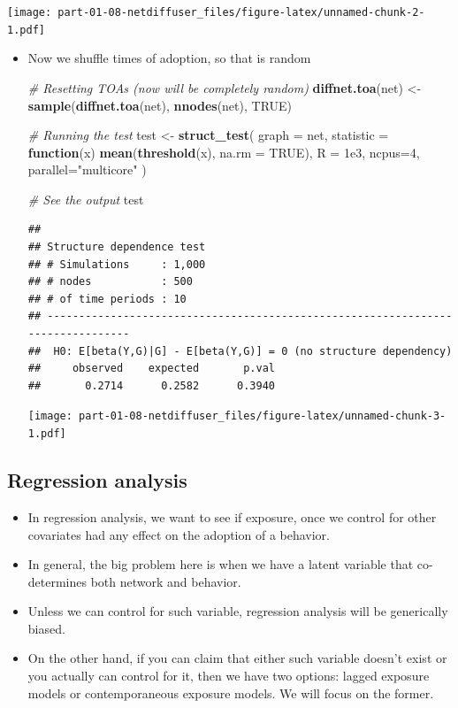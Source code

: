 \documentclass[]{book}
\newenvironment{Shaded}{\begin{snugshade}}{\end{snugshade}}
\newcommand{\CommentTok}[1]{\textcolor[rgb]{0.56,0.35,0.01}{\textit{#1}}}
\newcommand{\ControlFlowTok}[1]{\textcolor[rgb]{0.13,0.29,0.53}{\textbf{#1}}}
\newcommand{\DataTypeTok}[1]{\textcolor[rgb]{0.13,0.29,0.53}{#1}}
\newcommand{\DecValTok}[1]{\textcolor[rgb]{0.00,0.00,0.81}{#1}}
\newcommand{\FloatTok}[1]{\textcolor[rgb]{0.00,0.00,0.81}{#1}}
\newcommand{\KeywordTok}[1]{\textcolor[rgb]{0.13,0.29,0.53}{\textbf{#1}}}
\newcommand{\NormalTok}[1]{#1}
\newcommand{\OtherTok}[1]{\textcolor[rgb]{0.56,0.35,0.01}{#1}}
\newcommand{\StringTok}[1]{\textcolor[rgb]{0.31,0.60,0.02}{#1}}
\begin{document}
\texttt{[image: part-01-08-netdiffuser\_files/figure-latex/unnamed-chunk-2-1.pdf]}

\begin{itemize}
\item
  Now we shuffle times of adoption, so that is random

\begin{Shaded}
\begin{Highlighting}[]
\CommentTok{# Resetting TOAs (now will be completely random)}
\KeywordTok{diffnet.toa}\NormalTok{(net) <-}\StringTok{ }\KeywordTok{sample}\NormalTok{(}\KeywordTok{diffnet.toa}\NormalTok{(net), }\KeywordTok{nnodes}\NormalTok{(net), }\OtherTok{TRUE}\NormalTok{)}

\CommentTok{# Running the test}
\NormalTok{test <-}\StringTok{ }\KeywordTok{struct_test}\NormalTok{(}
  \DataTypeTok{graph     =}\NormalTok{ net, }
  \DataTypeTok{statistic =} \ControlFlowTok{function}\NormalTok{(x) }\KeywordTok{mean}\NormalTok{(}\KeywordTok{threshold}\NormalTok{(x), }\DataTypeTok{na.rm =} \OtherTok{TRUE}\NormalTok{),}
  \DataTypeTok{R         =} \FloatTok{1e3}\NormalTok{,}
  \DataTypeTok{ncpus=}\DecValTok{4}\NormalTok{, }\DataTypeTok{parallel=}\StringTok{"multicore"}
\NormalTok{  )}

\CommentTok{# See the output}
\NormalTok{test}
\end{Highlighting}
\end{Shaded}

\begin{verbatim}
## 
## Structure dependence test
## # Simulations     : 1,000
## # nodes           : 500
## # of time periods : 10
## --------------------------------------------------------------------------------
##  H0: E[beta(Y,G)|G] - E[beta(Y,G)] = 0 (no structure dependency)
##     observed    expected       p.val
##       0.2714      0.2582      0.3940
\end{verbatim}

  \texttt{[image: part-01-08-netdiffuser\_files/figure-latex/unnamed-chunk-3-1.pdf]}
\end{itemize}

\hypertarget{regression-analysis}{%
\subsection{Regression analysis}\label{regression-analysis}}

\begin{itemize}
\item
  In regression analysis, we want to see if exposure, once we control for other
  covariates had any effect on the adoption of a behavior.
\item
  In general, the big problem here is when we have a latent variable that
  co-determines both network and behavior.
\item
  Unless we can control for such variable, regression analysis will be
  generically biased.
\item
  On the other hand, if you can claim that either such variable doesn't exist
  or you actually can control for it, then we have two options: lagged exposure
  models or contemporaneous exposure models. We will focus on the former.
\end{itemize}
\end{document}
